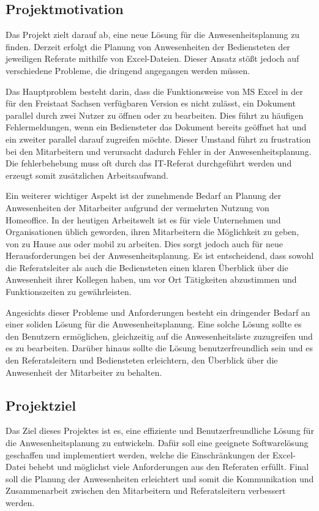 \subsection{Projektmotivation}
\label{sec:Projektmotivation}
Das Projekt zielt darauf ab, eine neue Lösung für die Anwesenheitsplanung zu finden. Derzeit erfolgt die Planung von Anwesenheiten der Bediensteten der jeweiligen Referate mithilfe von Excel-Dateien. Dieser Ansatz stößt jedoch auf verschiedene Probleme, die dringend angegangen werden müssen.

Das Hauptproblem besteht darin, dass die Funktionsweise von MS Excel in der für den Freistaat Sachsen verfügbaren Version es nicht zulässt, ein Dokument parallel durch zwei Nutzer zu öffnen oder zu bearbeiten. Dies führt zu häufigen Fehlermeldungen, wenn ein Bediensteter das Dokument bereits geöffnet hat und ein zweiter parallel darauf zugreifen möchte. Dieser Umstand führt zu frustration bei den Mitarbeitern und verursacht dadurch Fehler in der Anwesenheitsplanung. Die fehlerbehebung muss oft durch das IT-Referat durchgeführt werden und erzeugt somit zusätzlichen Arbeitsaufwand.

Ein weiterer wichtiger Aspekt ist der zunehmende Bedarf an Planung der Anwesenheiten der Mitarbeiter aufgrund der vermehrten Nutzung von Homeoffice. In der heutigen Arbeitswelt ist es für viele Unternehmen und Organisationen üblich geworden, ihren Mitarbeitern die Möglichkeit zu geben, von zu Hause aus oder mobil zu arbeiten. Dies sorgt jedoch auch für neue Herausforderungen bei der Anwesenheitsplanung. Es ist entscheidend, dass sowohl die Referatsleiter als auch die Bediensteten einen klaren Überblick über die Anwesenheit ihrer Kollegen haben, um vor Ort Tätigkeiten abzustimmen und \zB Funktionszeiten zu gewährleisten.

Angesichts dieser Probleme und Anforderungen besteht ein dringender Bedarf an einer soliden Lösung für die Anwesenheitsplanung. Eine solche Lösung sollte es den Benutzern ermöglichen, gleichzeitig auf die Anwesenheitsliste zuzugreifen und es zu bearbeiten. Darüber hinaus sollte die Lösung benutzerfreundlich sein und es den Referatsleitern und Bediensteten erleichtern, den Überblick über die Anwesenheit der Mitarbeiter zu behalten.


\subsection{Projektziel}
\label{sec:Projektziel}

Das Ziel dieses Projektes ist es, eine effiziente und Benutzerfreundliche Lösung für die Anwesenheitsplanung zu entwickeln. Dafür soll eine geeignete Softwarelösung geschaffen und implementiert werden, welche die Einschränkungen der Excel-Datei behebt und möglichst viele Anforderungen aus den Referaten erfüllt. Final soll die Planung der Anwesenheiten erleichtert und somit die Kommunikation und Zusammenarbeit zwischen den Mitarbeitern und Referatsleitern verbessert werden.
